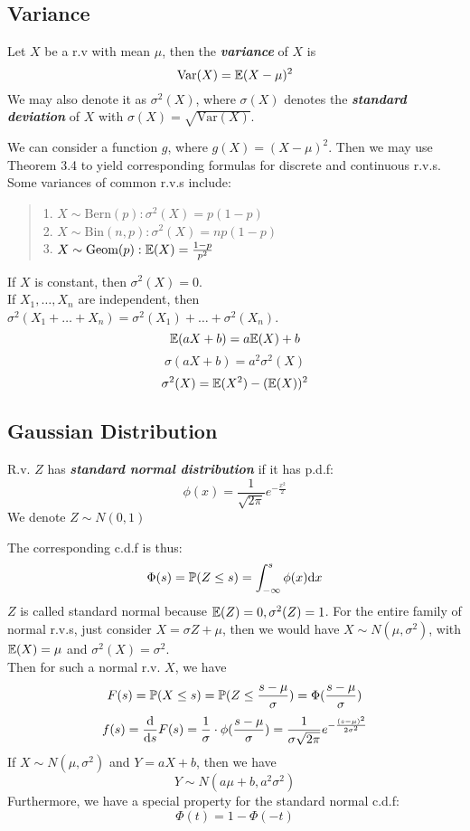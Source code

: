 \subsection{Variance}
\begin{definition}
    Let $X$ be a r.v with mean $\mu$, then the \textbf{\textit{variance}} of $X$ is
    $$\text{Var}(X) = \mathbb{E}(X - \mu)^2$$
    We may also denote it as $\sigma^2(X)$, where $\sigma(X)$ denotes the \textbf{\textit{standard deviation}} of $X$ with $\sigma(X) = \sqrt{\text{Var}(X)}$.
\end{definition}
We can consider a function $g$, where $g(X) = (X - \mu)^2$. Then we may use Theorem 3.4 to yield corresponding formulas for discrete and continuous r.v.s. \\
Some variances of common r.v.s include:
\begin{quote}
    1. $X \sim \text{Bern}(p): \sigma^2(X) = p(1-p)$ \\
    2. $X \sim \text{Bin}(n, p): \sigma^2(X) = np(1-p)$ \\
    3. $X \sim \text{Geom}(p): \mathbb{E}(X) = \frac{1-p}{p^2}$
\end{quote}
\begin{theorem}
    If $X$ is constant, then $\sigma^2(X) = 0$. \\
    If $X_1, \dots, X_n$ are independent, then $\sigma^2(X_1 + \dots + X_n) = \sigma^2(X_1) + \dots + \sigma^2(X_n)$.
    $$\mathbb{E}(aX+b) = a\mathbb{E}(X) + b$$
    $$\sigma(aX+b) =a^2\sigma^2(X)$$
    $$\sigma^2(X) = \mathbb{E}(X^2) - (\mathbb{E}(X))^2$$
\end{theorem}

\subsection{Gaussian Distribution}
\begin{definition}
    R.v. $Z$ has \textbf{\textit{standard normal distribution}} if it has p.d.f:
    $$\phi(x) = \frac{1}{\sqrt{2\pi}}e^{-\frac{x^2}{2}}$$
    We denote $Z \sim N(0, 1)$
\end{definition}
The corresponding c.d.f is thus:
$$\Phi(s) = \mathbb{P}(Z \le s) = \int_{-\infty}^{s} \phi(x) \dd x$$
$Z$ is called standard normal because $\mathbb{E}(Z) = 0, \sigma^2(Z) = 1$. For the entire family of normal r.v.s, just consider $X = \sigma Z + \mu$, then we would have $X \sim N(\mu, \sigma^2)$, with $\mathbb{E}(X) = \mu$ and $\sigma^2(X) = \sigma^2$. \\
Then for such a normal r.v. $X$, we have
$$F(s) = \mathbb{P}(X \le s) = \mathbb{P}(Z \le \frac{s - \mu}{\sigma}) = \Phi(\frac{s-\mu}{\sigma})$$
$$f(s) = \dv{s}F(s) = \frac{1}{\sigma} \cdot \phi(\frac{s-\mu}{\sigma}) = \frac{1}{\sigma\sqrt{2\pi}}e^{-\frac{(s - \mu)^2}{2\sigma^2}}$$
If $X \sim N(\mu, \sigma^2)$ and $Y = aX+b$, then we have
$$Y \sim N(a\mu + b, a^2\sigma^2)$$
Furthermore, we have a special property for the standard normal c.d.f:
$$\Phi(t) = 1 - \Phi(-t)$$

\newpage